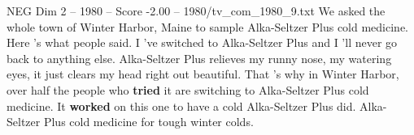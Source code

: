\begin{textsample}{NEG Dim 2 – 1980 – Score -2.00 – 1980/tv\_com\_1980\_9.txt}  \label{ex:f2_neg_023}
We asked the whole town of Winter Harbor, Maine to sample Alka-Seltzer Plus cold medicine.
Here 's what people said.
I 've switched to Alka-Seltzer Plus and I 'll never go back to anything else.
Alka-Seltzer Plus relieves my runny nose, my watering eyes, it just clears my head right out beautiful.
That 's why in Winter Harbor, over half the people who \textbf{tried} it are switching to Alka-Seltzer Plus cold medicine.
It \textbf{worked} on this one to have a cold Alka-Seltzer Plus did.
Alka-Seltzer Plus cold medicine for tough winter colds.

\end{textsample}
